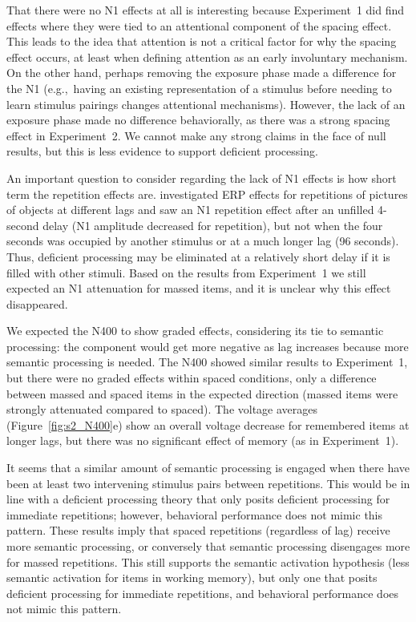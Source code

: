 That there were no N1 effects at all is interesting because Experiment~1 did find effects where they were tied to an attentional component of the spacing effect.  This leads to the idea that attention is not a critical factor for why the spacing effect occurs, at least when defining attention as an early involuntary mechanism.  On the other hand, perhaps removing the exposure phase made a difference for the N1 (e.g.,~having an existing representation of a stimulus before needing to learn stimulus pairings changes attentional mechanisms).  However, the lack of an exposure phase made no difference behaviorally, as there was a strong spacing effect in Experiment~2.  We cannot make any strong claims in the face of null results, but this is less evidence to support deficient processing.

An important question to consider regarding the lack of N1 effects is how short term the repetition effects are.   investigated ERP effects for repetitions of pictures of objects at different lags and saw an N1 repetition effect after an unfilled 4-second delay (N1 amplitude decreased for repetition), but not when the four seconds was occupied by another stimulus or at a much longer lag (96 seconds).  Thus, deficient processing may be eliminated at a relatively short delay if it is filled with other stimuli.  Based on the results from Experiment~1 we still expected an N1 attenuation for massed items, and it is unclear why this effect disappeared.



We expected the N400 to show graded effects, considering its tie to  semantic processing: the component would get more negative as lag increases because more semantic processing is needed.  The N400 showed similar results to Experiment~1, but there were no graded effects within spaced conditions, only a difference between massed and spaced items in the expected direction (massed items were strongly attenuated compared to spaced).  The voltage averages (Figure~\ref{fig:s2_N400}e) show an overall voltage decrease for remembered items at longer lags, but there was no significant effect of memory (as in Experiment~1).

It seems that a similar amount of semantic processing is engaged when there have been at least two intervening stimulus pairs between repetitions.  This would be in line with a deficient processing theory that only posits deficient processing for immediate repetitions; however, behavioral performance does not mimic this pattern.
These results imply that spaced repetitions (regardless of lag) receive more semantic processing, or conversely that semantic processing disengages more for massed repetitions.  This still supports the  semantic activation hypothesis (less semantic activation for items in working memory), but only one that posits deficient processing for immediate repetitions, and behavioral performance does not mimic this pattern.

